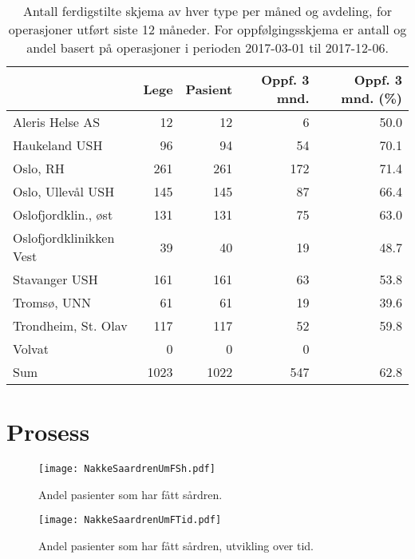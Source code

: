 \documentclass[presentation,xcolor=pdftex,dvipsnames,table]{beamer}\usepackage[]{graphicx}\usepackage[]{color}
\begin{document}
\begin{tiny}
\begin{frame}[fragile]
\begin{table}[ht]
\centering
\begin{tabular}{lrrrr}
  \hline
 & Lege & Pasient & Oppf. 3 mnd. & Oppf. 3 mnd. (\%) \\ 
  \hline
Aleris Helse AS & 12 & 12 & 6 & 50.0 \\ 
  Haukeland USH & 96 & 94 & 54 & 70.1 \\ 
  Oslo, RH & 261 & 261 & 172 & 71.4 \\ 
  Oslo, Ullevål USH & 145 & 145 & 87 & 66.4 \\ 
  Oslofjordklin., øst & 131 & 131 & 75 & 63.0 \\ 
  Oslofjordklinikken Vest & 39 & 40 & 19 & 48.7 \\ 
  Stavanger USH & 161 & 161 & 63 & 53.8 \\ 
  Tromsø, UNN & 61 & 61 & 19 & 39.6 \\ 
  Trondheim, St. Olav & 117 & 117 & 52 & 59.8 \\ 
  Volvat & 0 & 0 & 0 &  \\ 
  Sum & 1023 & 1022 & 547 & 62.8 \\ 
   \hline
\end{tabular}
\caption{Antall ferdigstilte skjema av hver type per måned og avdeling, for operasjoner
                                  utført siste 12 måneder. For oppfølgingsskjema er antall og andel basert på operasjoner i perioden 2017-03-01 til 2017-12-06.} 
\end{table}

\end{frame}






\section{Prosess}

\begin{frame}[fragile]
\begin{figure}[ht]
\centering
\texttt{[image: NakkeSaardrenUmFSh.pdf]}
\caption[scale=0.3]{Andel pasienter som har fått sårdren. }
\end{figure}
\end{frame}

\begin{frame}[fragile]
\begin{figure}[ht]
\centering
\texttt{[image: NakkeSaardrenUmFTid.pdf]}
\caption{Andel pasienter som har fått sårdren, utvikling over tid. }
\end{figure}
\end{frame}



\end{tiny}
\end{document}
